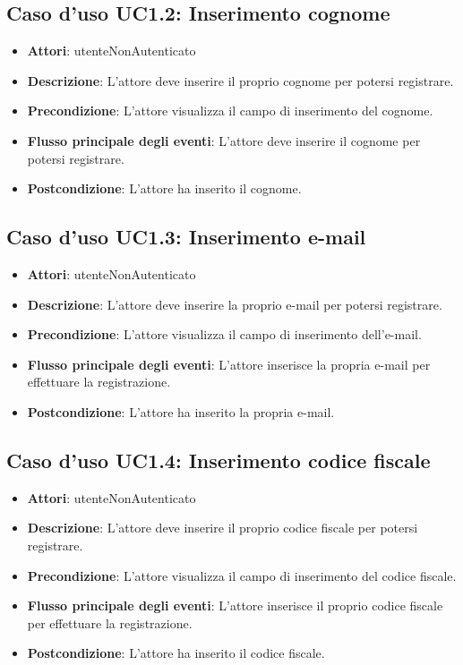 \subsection{Caso d'uso \texorpdfstring{UC1.2}{UC1.2}: Inserimento cognome}
\begin{itemize}
\item \textbf{Attori}: utenteNonAutenticato
\item \textbf{Descrizione}: L'attore deve inserire il proprio cognome per potersi registrare.
\item \textbf{Precondizione}: L'attore visualizza il campo di inserimento del cognome.
\item \textbf{Flusso principale degli eventi}: L'attore deve inserire il cognome per potersi registrare.
\item \textbf{Postcondizione}: L'attore ha inserito il cognome.
\end{itemize}
\subsection{Caso d'uso \texorpdfstring{UC1.3}{UC1.3}: Inserimento e-mail}
\begin{itemize}
\item \textbf{Attori}: utenteNonAutenticato
\item \textbf{Descrizione}: L'attore deve inserire la proprio e-mail per potersi registrare.
\item \textbf{Precondizione}: L'attore visualizza il campo di inserimento dell'e-mail.
\item \textbf{Flusso principale degli eventi}: L'attore inserisce la propria e-mail per effettuare la registrazione.
\item \textbf{Postcondizione}: L'attore ha inserito la propria e-mail.
\end{itemize}
\subsection{Caso d'uso \texorpdfstring{UC1.4}{UC1.4}: Inserimento codice fiscale}
\begin{itemize}
\item \textbf{Attori}: utenteNonAutenticato
\item \textbf{Descrizione}: L'attore deve inserire il proprio codice fiscale per potersi registrare.
\item \textbf{Precondizione}: L'attore visualizza il campo di inserimento del codice fiscale.
\item \textbf{Flusso principale degli eventi}: L'attore inserisce il proprio codice fiscale per effettuare la registrazione.
\item \textbf{Postcondizione}: L'attore ha inserito il codice fiscale.
\end{itemize}
